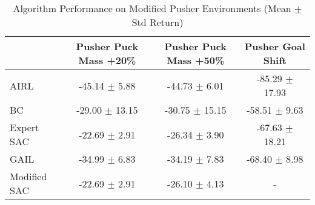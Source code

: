 \begin{table}
\caption{Algorithm Performance on Modified Pusher Environments (Mean $\pm$ Std Return)}
\label{tab:perf_mod_pusher}
\begin{tabular}{lccc}
\toprule
 & Pusher Puck Mass +20\% & Pusher Puck Mass +50\% & Pusher Goal Shift \\
\midrule
AIRL & -45.14 $\pm$ 5.88 & -44.73 $\pm$ 6.01 & -85.29 $\pm$ 17.93 \\
BC & -29.00 $\pm$ 13.15 & -30.75 $\pm$ 15.15 & -58.51 $\pm$ 9.63 \\
Expert SAC & -22.69 $\pm$ 2.91 & -26.34 $\pm$ 3.90 & -67.63 $\pm$ 18.21 \\
GAIL & -34.99 $\pm$ 6.83 & -34.19 $\pm$ 7.83 & -68.40 $\pm$ 8.98 \\
Modified SAC & -22.69 $\pm$ 2.91 & -26.10 $\pm$ 4.13 & - \\
\bottomrule
\end{tabular}
\end{table}

